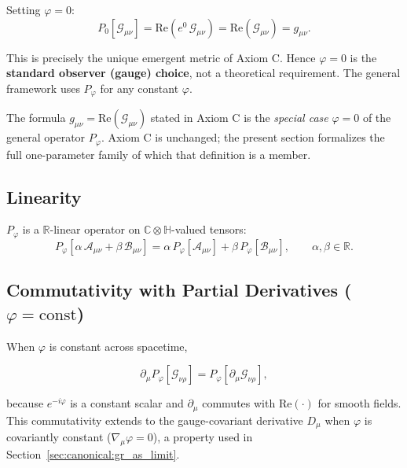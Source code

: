 Setting $\varphi = 0$:
\begin{equation}
\label{eq:phase_proj_phi0}
P_0[\mathcal{G}_{\mu\nu}] = \mathrm{Re}\!\left(e^{0}\,\mathcal{G}_{\mu\nu}\right) = \mathrm{Re}(\mathcal{G}_{\mu\nu}) = g_{\mu\nu}.
\end{equation}

This is precisely the unique emergent metric of Axiom C.  Hence $\varphi = 0$ is the
\textbf{standard observer (gauge) choice}, not a theoretical requirement.  The general
framework uses $P_\varphi$ for any constant $\varphi$.

\begin{tcolorbox}[colback=blue!5!white,colframe=blue!75!black,title=Note on Axiom C]
The formula $g_{\mu\nu} = \mathrm{Re}(\mathcal{G}_{\mu\nu})$ stated in Axiom C is the \emph{special case}
$\varphi = 0$ of the general operator $P_\varphi$.  Axiom C is unchanged; the present section
formalizes the full one-parameter family of which that definition is a member.
\end{tcolorbox}

\subsection{Linearity}

$P_\varphi$ is a $\mathbb{R}$-linear operator on $\mathbb{C}\otimes\mathbb{H}$-valued tensors:
\begin{equation}
P_\varphi[\alpha\,\mathcal{A}_{\mu\nu} + \beta\,\mathcal{B}_{\mu\nu}]
= \alpha\,P_\varphi[\mathcal{A}_{\mu\nu}] + \beta\,P_\varphi[\mathcal{B}_{\mu\nu}],
\qquad \alpha,\beta\in\mathbb{R}.
\end{equation}

\subsection{Commutativity with Partial Derivatives ($\varphi = \mathrm{const}$)}

When $\varphi$ is constant across spacetime,

\begin{equation}
\label{eq:proj_commutes_partial}
\partial_\mu P_\varphi[\mathcal{G}_{\nu\rho}]
= P_\varphi[\partial_\mu \mathcal{G}_{\nu\rho}],
\end{equation}

because $e^{-i\varphi}$ is a constant scalar and $\partial_\mu$ commutes with $\mathrm{Re}(\cdot)$ for
smooth fields.  This commutativity extends to the gauge-covariant derivative $D_\mu$ when $\varphi$ is
covariantly constant ($\nabla_\mu\varphi = 0$), a property used in
Section~\ref{sec:canonical:gr_as_limit}.


